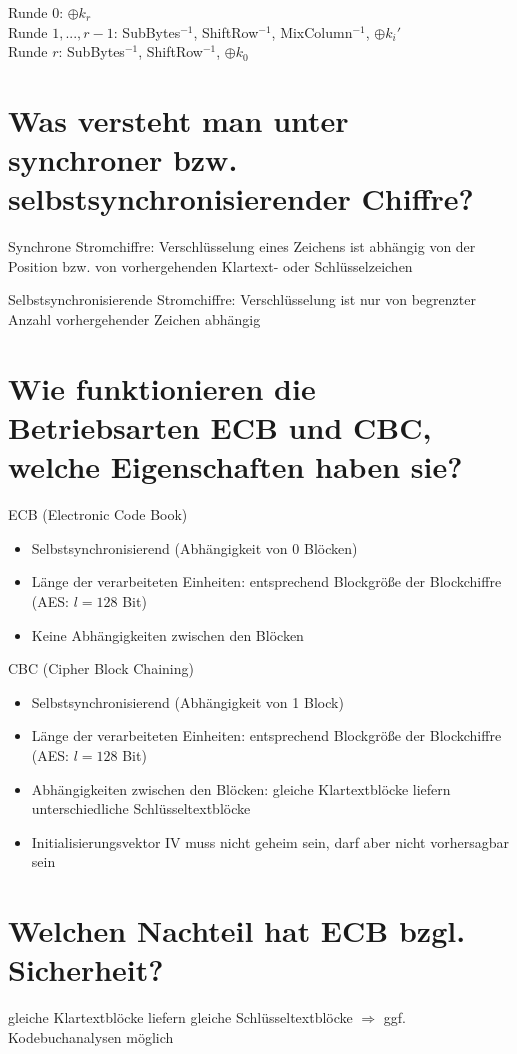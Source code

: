 \documentclass{article}
\begin{document}
	Runde 0: $\oplus k_r$ \\
	Runde $1,...,r-1$: SubBytes$^{-1}$, ShiftRow$^{-1}$, MixColumn$^{-1}$, $\oplus k_i'$ \\
	Runde $r$: SubBytes$^{-1}$, ShiftRow$^{-1}$, $\oplus k_0$
	
	\section*{Was versteht man unter synchroner bzw. selbstsynchronisierender Chiffre?}
	Synchrone Stromchiffre: Verschlüsselung eines Zeichens ist abhängig von der Position bzw. von vorhergehenden Klartext- oder Schlüsselzeichen
	
	Selbstsynchronisierende Stromchiffre: Verschlüsselung ist nur von begrenzter Anzahl vorhergehender Zeichen abhängig
	
	\section*{Wie funktionieren die Betriebsarten ECB und CBC, welche Eigenschaften haben sie?}
	ECB (Electronic Code Book)
	\begin{itemize}
		\item Selbstsynchronisierend (Abhängigkeit von 0 Blöcken)
		\item Länge der verarbeiteten Einheiten: entsprechend Blockgröße der Blockchiffre (AES: $l = 128$ Bit)
		\item Keine Abhängigkeiten zwischen den Blöcken
	\end{itemize}

	CBC (Cipher Block Chaining)
	\begin{itemize}
		\item Selbstsynchronisierend (Abhängigkeit von 1 Block)
		\item Länge der verarbeiteten Einheiten: entsprechend Blockgröße der Blockchiffre (AES: $l = 128$ Bit)
		\item Abhängigkeiten zwischen den Blöcken: gleiche Klartextblöcke liefern unterschiedliche Schlüsseltextblöcke
		\item Initialisierungsvektor IV muss nicht geheim sein, darf aber nicht vorhersagbar sein
	\end{itemize}
	
	\section*{Welchen Nachteil hat ECB bzgl. Sicherheit?}
	gleiche Klartextblöcke liefern gleiche Schlüsseltextblöcke $\Rightarrow$ ggf. Kodebuchanalysen möglich
	
\end{document}

